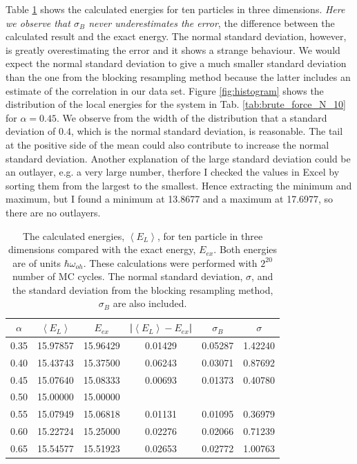 Table \ref{tab:brute_force_N_10_MC_20} shows the  calculated energies for ten particles in three dimensions. \textit{Here we observe that $\sigma_B$ never underestimates the error}, the difference between the calculated result and the exact energy. The normal standard deviation, however, is greatly overestimating the error and it shows a strange behaviour. We would expect the normal standard deviation to give a much smaller standard deviation than the one from the blocking resampling method because the latter includes an estimate of the correlation in our data set. Figure \ref{fig:histogram} shows the distribution of the local energies for the system in Tab. \ref{tab:brute_force_N_10} for $\alpha = 0.45$. We observe from the width of the distribution that a standard deviation of $0.4$, which is the normal standard deviation, is reasonable. The tail at the positive side of the mean could also contribute to increase the normal standard deviation. Another explanation of the large standard deviation could be an outlayer, e.g. a very large number, therfore I checked the values in Excel by sorting them from the largest to the smallest. Hence extracting the minimum and maximum, but I found a minimum at 13.8677 and a maximum at 17.6977, so there are no outlayers. 


\begin{table}[H]\caption{The calculated energies, $\left<E_L\right>$, for ten particle in three dimensions compared with the exact energy, $E_{ex}$. Both energies are of units $\hbar\omega_{oh}$. These calculations were performed with $2^{20}$ number of MC cycles. The normal standard deviation, $\sigma$, and the standard deviation from the blocking resampling method, $\sigma_B$ are also included.}\label{tab:brute_force_N_10_MC_20}
\center
\begin{tabular}{cccccc}
$\alpha$ & $\left< E_L \right>$ & $E_{ex}$ & |$\left< E_L \right>-E_{ex}$|  & $\sigma_B$ & $\sigma$\\ \hline
0.35 & 15.97857 & 15.96429 & 0.01429 & 0.05287 & 1.42240\\
0.40 & 15.43743 & 15.37500 & 0.06243 & 0.03071 & 0.87692\\
0.45 & 15.07640 & 15.08333 & 0.00693 & 0.01373 & 0.40780\\
0.50 & 15.00000 & 15.00000 &                &                &                \\
0.55 & 15.07949 & 15.06818 & 0.01131 & 0.01095 & 0.36979\\
0.60 & 15.22724 & 15.25000 & 0.02276 & 0.02066 & 0.71239\\
0.65 & 15.54577 & 15.51923 & 0.02653 & 0.02772 & 1.00763\\
\end{tabular}
\end{table} 

